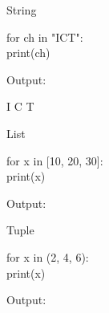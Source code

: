 \noindent
\begin{minipage}[t]{0.32\linewidth}

\begin{sideexamplebox}{String}

\begin{sidecodebox}
\begin{english}
\ttfamily
for ch in "ICT":\\
\hspace*{4mm}print(ch)
\end{english}
\end{sidecodebox}

Output:

\begin{center}
\textenglish{\ttfamily I \quad C \quad T}
\end{center}

\end{sideexamplebox}

\end{minipage}
\hfill
\begin{minipage}[t]{0.32\linewidth}

\begin{sideexamplebox}{List}

\begin{sidecodebox}
\begin{english}
\ttfamily
for x in [10, 20, 30]:\\
\hspace*{4mm}print(x)
\end{english}
\end{sidecodebox}

Output:

\begin{center}
\textenglish{  }
\end{center}

\end{sideexamplebox}

\end{minipage}
\hfill
\begin{minipage}[t]{0.32\linewidth}

\begin{sideexamplebox}{Tuple}

\begin{sidecodebox}
\begin{english}
\ttfamily
for x in (2, 4, 6):\\
\hspace*{4mm}print(x)
\end{english}
\end{sidecodebox}

Output:

\begin{center}
\textenglish{  }
\end{center}

\end{sideexamplebox}

\end{minipage}

